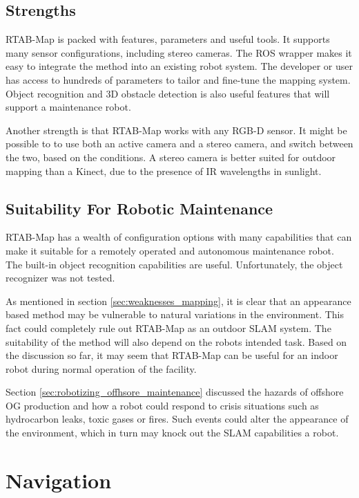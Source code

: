\subsection{Strengths}

\ac{RTAB-Map} is packed with features, parameters and useful tools. It supports many sensor configurations, including stereo cameras. The \ac{ROS} wrapper makes it easy to integrate the method into an existing robot system. The developer or user has access to hundreds of parameters to tailor and fine-tune the mapping system. Object recognition and 3D obstacle detection is also useful features that will support a maintenance robot. 

Another strength is that \ac{RTAB-Map} works with any RGB-D sensor. It might be possible to to use both an active camera and a stereo camera, and switch between the two, based on the conditions. A stereo camera is better suited for outdoor mapping than a Kinect, due to the presence of IR wavelengths in sunlight. 


\subsection{Suitability For Robotic Maintenance}

\ac{RTAB-Map} has a wealth of configuration options with many capabilities that can make it suitable for a remotely operated and autonomous maintenance robot. The built-in object recognition capabilities are useful. Unfortunately, the object recognizer was not tested. 

As mentioned in section \ref{sec:weaknesses_mapping}, it is clear that an appearance based method may be vulnerable to natural variations in the environment. This fact could completely rule out \ac{RTAB-Map} as an outdoor \ac{SLAM} system. The suitability of the method will also depend on the robots intended task. Based on the discussion so far, it may seem that \ac{RTAB-Map} can be useful for an indoor robot during normal operation of the facility. 

Section \ref{sec:robotizing_offhsore_maintenance} discussed the hazards of offshore \ac{OG} production and how a robot could respond to crisis situations such as hydrocarbon leaks, toxic gases or fires. Such events could alter the appearance of the environment, which in turn may knock out the \ac{SLAM} capabilities a robot.

\section{Navigation}

